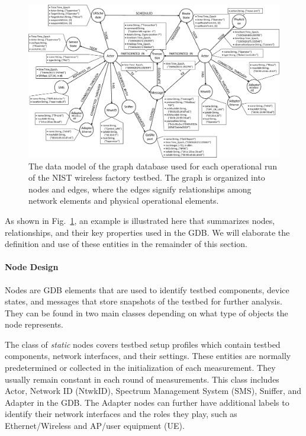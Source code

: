 \begin{figure}
	\centering
	\includegraphics[width=\textwidth]{chapter-gdb-appl/figures/graph_schema_1209.eps}
	\caption{The data model of the graph database used for each operational run of the NIST wireless factory testbed.  The graph is organized into nodes and edges, where the edges signify relationships among network elements and physical operational elements.\vspace{-0.4in}}
	\label{gdbappl:fig:database:schema}
\end{figure}

As shown in Fig.~\ref{gdbappl:fig:database:schema}, an example is illustrated here that summarizes nodes, relationships, and their key properties used in the GDB. We will elaborate the definition and use of these entities in the remainder of this section.			


\paragraph{Node Design}

Nodes are GDB elements that are used to identify testbed components, device states, and messages that store snapshots of the testbed for further analysis. They can be found in two main classes depending on what type of objects the node represents.

The class of \textit{static} nodes covers testbed setup profiles which contain testbed components, network interfaces, and their settings. These entities are normally predetermined or collected in the initialization of each measurement. They usually remain constant in each round of measurements. This class includes Actor, Network ID (NtwkID), Spectrum Management System (SMS), Sniffer, and Adapter in the GDB. The Adapter nodes can further have additional labels to identify their network interfaces and the roles they play, such as Ethernet/Wireless and AP/user equipment (UE).

